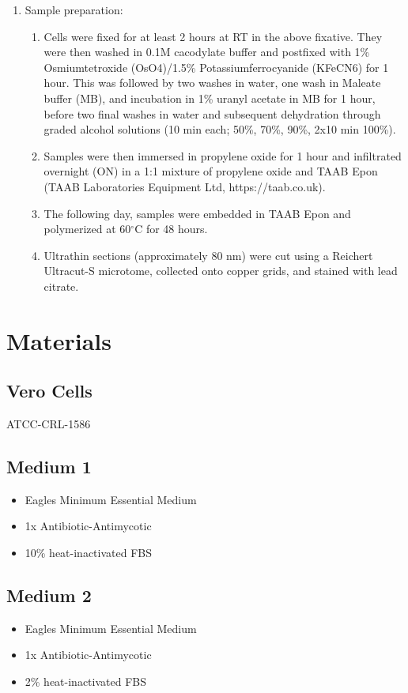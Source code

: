 \documentclass[12pt,a4paper]{article}
\begin{document}
\begin{enumerate}[label=\arabic*.]
\begin{enumerate}[label=\alph*.]
        \item Sample preparation:
        \begin{enumerate}[label=\arabic*.]
            \item Cells were fixed for at least 2 hours at RT in the above fixative. They were then washed in 0.1M cacodylate buffer and postfixed with 1\% Osmiumtetroxide (OsO4)/1.5\% Potassiumferrocyanide (KFeCN6) for 1 hour. This was followed by two washes in water, one wash in Maleate buffer (MB), and incubation in 1\% uranyl acetate in MB for 1 hour, before two final washes in water and subsequent dehydration through graded alcohol solutions (10 min each; 50\%, 70\%, 90\%, 2x10 min 100\%).
            \item Samples were then immersed in propylene oxide for 1 hour and infiltrated overnight (ON) in a 1:1 mixture of propylene oxide and TAAB Epon (TAAB Laboratories Equipment Ltd, https://taab.co.uk).
            \item The following day, samples were embedded in TAAB Epon and polymerized at 60$^{\circ}$C for 48 hours.
            \item Ultrathin sections (approximately 80 nm) were cut using a Reichert Ultracut-S microtome, collected onto copper grids, and stained with lead citrate.
        \end{enumerate}
    \end{enumerate}

\end{enumerate}

\section{Materials}
\subsection{Vero Cells}
ATCC-CRL-1586 \cite{ATCCVERO}
\subsection{Medium 1}
\begin{itemize}
    \item Eagles Minimum Essential Medium \cite{ATCCEMEM}
    \item 1x Antibiotic-Antimycotic
    \item 10\% heat-inactivated FBS
\end{itemize}
\subsection{Medium 2}
\begin{itemize}
    \item Eagles Minimum Essential Medium \cite{ATCCEMEM}
    \item 1x Antibiotic-Antimycotic
    \item 2\% heat-inactivated FBS
\end{itemize}
\end{document}
